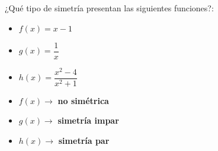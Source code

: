 \vspace{1cm}


\begin{ex}
	¿Qué tipo de simetría presentan las siguientes funciones?:\\
	\begin{itemize}
		\item $f(x) = x-1$
		\item $g(x) = \dfrac{1}{x}$
		\item $h(x) = \dfrac{x^2-4}{x^2+1}$
	\end{itemize}
	\begin{sol}
		\begin{itemize}
			\item $f(x) \rightarrow$ \textbf{no simétrica}
			\item $g(x) \rightarrow$ \textbf{simetría impar}
			\item $h(x) \rightarrow$ \textbf{simetría par}
		\end{itemize}
	\end{sol}
\end{ex}


